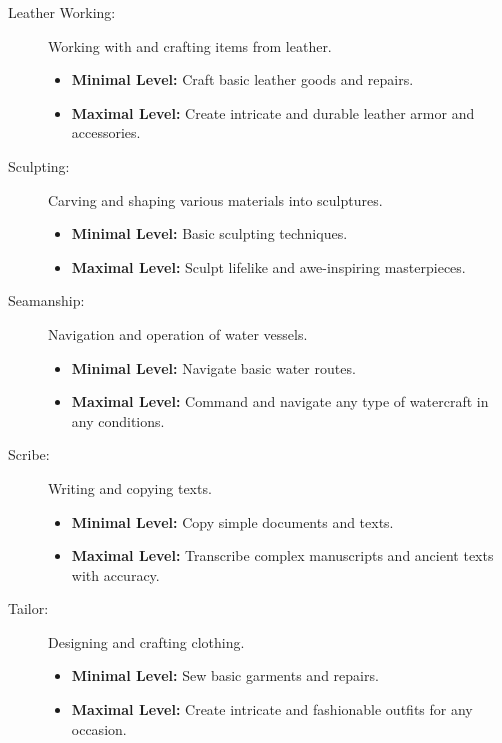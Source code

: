 \documentclass[12pt]{book}  %
\begin{document}
\begin{description}
    \item[Leather Working:] Working with and crafting items from leather.
        \begin{itemize}
            \item \textbf{Minimal Level:} Craft basic leather goods and repairs.
            \item \textbf{Maximal Level:} Create intricate and durable leather armor and accessories.
        \end{itemize}

    \item[Sculpting:] Carving and shaping various materials into sculptures.
        \begin{itemize}
            \item \textbf{Minimal Level:} Basic sculpting techniques.
            \item \textbf{Maximal Level:} Sculpt lifelike and awe-inspiring masterpieces.
        \end{itemize}

    \item[Seamanship:] Navigation and operation of water vessels.
        \begin{itemize}
            \item \textbf{Minimal Level:} Navigate basic water routes.
            \item \textbf{Maximal Level:} Command and navigate any type of watercraft in any conditions.
        \end{itemize}

    \item[Scribe:] Writing and copying texts.
        \begin{itemize}
            \item \textbf{Minimal Level:} Copy simple documents and texts.
            \item \textbf{Maximal Level:} Transcribe complex manuscripts and ancient texts with accuracy.
        \end{itemize}

    \item[Tailor:] Designing and crafting clothing.
        \begin{itemize}
            \item \textbf{Minimal Level:} Sew basic garments and repairs.
            \item \textbf{Maximal Level:} Create intricate and fashionable outfits for any occasion.
        \end{itemize}


\end{description}
\end{document}
